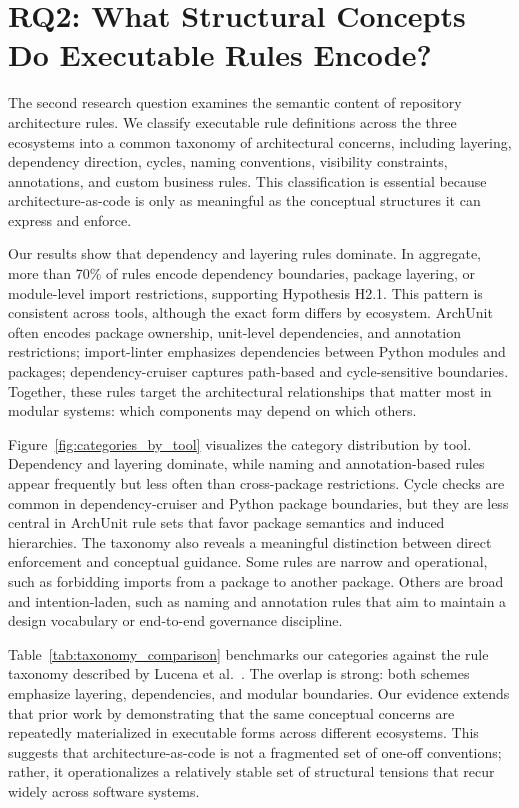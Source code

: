 \section{RQ2: What Structural Concepts Do Executable Rules Encode?}\label{sec:rq2}

The second research question examines the semantic content of repository architecture rules. We classify executable rule definitions across the three ecosystems into a common taxonomy of architectural concerns, including layering, dependency direction, cycles, naming conventions, visibility constraints, annotations, and custom business rules. This classification is essential because architecture-as-code is only as meaningful as the conceptual structures it can express and enforce.

Our results show that dependency and layering rules dominate. In aggregate, more than 70\% of rules encode dependency boundaries, package layering, or module-level import restrictions, supporting Hypothesis H2.1. This pattern is consistent across tools, although the exact form differs by ecosystem. ArchUnit often encodes package ownership, unit-level dependencies, and annotation restrictions; import-linter emphasizes dependencies between Python modules and packages; dependency-cruiser captures path-based and cycle-sensitive boundaries. Together, these rules target the architectural relationships that matter most in modular systems: which components may depend on which others.

Figure~\ref{fig:categories_by_tool} visualizes the category distribution by tool. Dependency and layering dominate, while naming and annotation-based rules appear frequently but less often than cross-package restrictions. Cycle checks are common in dependency-cruiser and Python package boundaries, but they are less central in ArchUnit rule sets that favor package semantics and induced hierarchies. The taxonomy also reveals a meaningful distinction between direct enforcement and conceptual guidance. Some rules are narrow and operational, such as forbidding imports from a package to another package. Others are broad and intention-laden, such as naming and annotation rules that aim to maintain a design vocabulary or end-to-end governance discipline.

Table~\ref{tab:taxonomy_comparison} benchmarks our categories against the rule taxonomy described by Lucena et al.~\cite{lucena2026ecsa}. The overlap is strong: both schemes emphasize layering, dependencies, and modular boundaries. Our evidence extends that prior work by demonstrating that the same conceptual concerns are repeatedly materialized in executable forms across different ecosystems. This suggests that architecture-as-code is not a fragmented set of one-off conventions; rather, it operationalizes a relatively stable set of structural tensions that recur widely across software systems.




